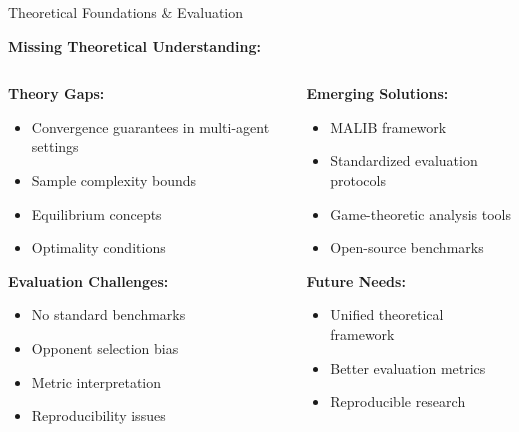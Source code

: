 \documentclass[aspectratio=169]{beamer}
\begin{document}
\begin{frame}{Theoretical Foundations \& Evaluation}
    
    \textbf{Missing Theoretical Understanding:} \autocite{fish_algorithmic_2025}
    
    \vfill
    
    \begin{columns}
        \begin{column}{0.6\textwidth}
            \textbf{Theory Gaps:}
            \begin{itemize}
                \item Convergence guarantees in multi-agent settings
                \item Sample complexity bounds
                \item Equilibrium concepts
                \item Optimality conditions
            \end{itemize}
            
            \vfill
            \textbf{Evaluation Challenges:}
            \begin{itemize}
                \item No standard benchmarks
                \item Opponent selection bias
                \item Metric interpretation
                \item Reproducibility issues
            \end{itemize}
        \end{column}
        \begin{column}{0.4\textwidth}
            \textbf{Emerging Solutions:}
            \begin{itemize}
                \item MALIB framework \autocite{zhou_malib_2023}
                \item Standardized evaluation protocols
                \item Game-theoretic analysis tools
                \item Open-source benchmarks
            \end{itemize}
            
            \vfill
            \textbf{Future Needs:}
            \begin{itemize}
                \item Unified theoretical framework
                \item Better evaluation metrics
                \item Reproducible research
            \end{itemize}
        \end{column}
    \end{columns}
\end{frame}
\end{document}
